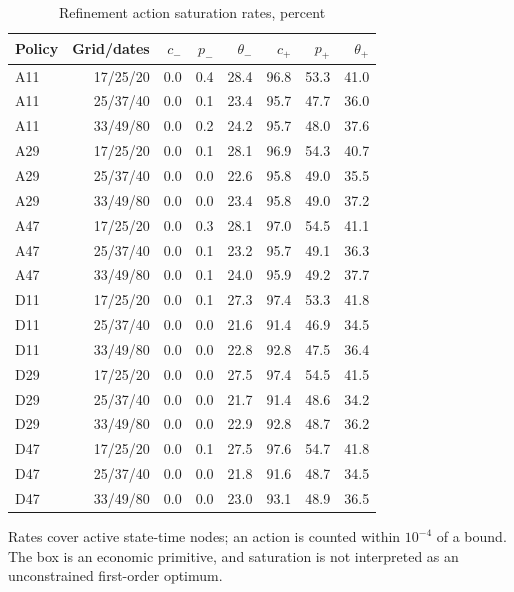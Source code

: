 \begin{table}[htbp]
\centering\footnotesize\setlength{\tabcolsep}{4pt}
\caption{Refinement action saturation rates, percent}\label{tab:r9saturation}
\begin{tabular}{lrrrrrrr}
\toprule
Policy & Grid/dates & $c_-$ & $p_-$ & $\theta_-$ & $c_+$ & $p_+$ & $\theta_+$ \\
\midrule
A11 & 17/25/20 & 0.0 & 0.4 & 28.4 & 96.8 & 53.3 & 41.0 \\
A11 & 25/37/40 & 0.0 & 0.1 & 23.4 & 95.7 & 47.7 & 36.0 \\
A11 & 33/49/80 & 0.0 & 0.2 & 24.2 & 95.7 & 48.0 & 37.6 \\
A29 & 17/25/20 & 0.0 & 0.1 & 28.1 & 96.9 & 54.3 & 40.7 \\
A29 & 25/37/40 & 0.0 & 0.0 & 22.6 & 95.8 & 49.0 & 35.5 \\
A29 & 33/49/80 & 0.0 & 0.0 & 23.4 & 95.8 & 49.0 & 37.2 \\
A47 & 17/25/20 & 0.0 & 0.3 & 28.1 & 97.0 & 54.5 & 41.1 \\
A47 & 25/37/40 & 0.0 & 0.1 & 23.2 & 95.7 & 49.1 & 36.3 \\
A47 & 33/49/80 & 0.0 & 0.1 & 24.0 & 95.9 & 49.2 & 37.7 \\
D11 & 17/25/20 & 0.0 & 0.1 & 27.3 & 97.4 & 53.3 & 41.8 \\
D11 & 25/37/40 & 0.0 & 0.0 & 21.6 & 91.4 & 46.9 & 34.5 \\
D11 & 33/49/80 & 0.0 & 0.0 & 22.8 & 92.8 & 47.5 & 36.4 \\
D29 & 17/25/20 & 0.0 & 0.0 & 27.5 & 97.4 & 54.5 & 41.5 \\
D29 & 25/37/40 & 0.0 & 0.0 & 21.7 & 91.4 & 48.6 & 34.2 \\
D29 & 33/49/80 & 0.0 & 0.0 & 22.9 & 92.8 & 48.7 & 36.2 \\
D47 & 17/25/20 & 0.0 & 0.1 & 27.5 & 97.6 & 54.7 & 41.8 \\
D47 & 25/37/40 & 0.0 & 0.0 & 21.8 & 91.6 & 48.7 & 34.5 \\
D47 & 33/49/80 & 0.0 & 0.0 & 23.0 & 93.1 & 48.9 & 36.5 \\
\bottomrule
\end{tabular}
\par\vspace{3pt}\begin{minipage}{0.97\linewidth}\footnotesize Rates cover active state-time nodes; an action is counted within $10^{-4}$ of a bound. The box is an economic primitive, and saturation is not interpreted as an unconstrained first-order optimum.\end{minipage}
\end{table}
